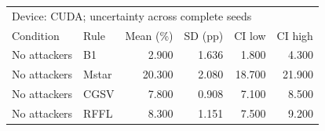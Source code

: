 \begin{tabular}{llrrrr}
\toprule
\multicolumn{6}{l}{Device: CUDA; uncertainty across complete seeds} \\
Condition & Rule & Mean (\%) & SD (pp) & CI low & CI high \\
\midrule
No attackers & B1 & 2.900 & 1.636 & 1.800 & 4.300 \\
No attackers & Mstar & 20.300 & 2.080 & 18.700 & 21.900 \\
No attackers & CGSV & 7.800 & 0.908 & 7.100 & 8.500 \\
No attackers & RFFL & 8.300 & 1.151 & 7.500 & 9.200 \\
\bottomrule
\end{tabular}
